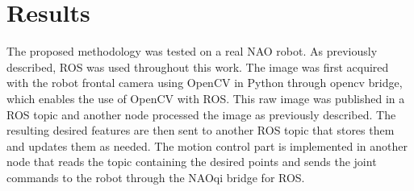 \documentclass[conference]{IEEEtran}
\begin{document}
\section{Results}

The proposed methodology was tested on a real NAO robot. As previously described, ROS was used throughout this work. The image was first acquired with the robot frontal camera using OpenCV in Python through opencv bridge, which enables the use of OpenCV with ROS. This raw image was published in a ROS topic and another node processed the image as previously described. The resulting desired features are then sent to another ROS topic that stores them and updates them as needed. The motion control part is implemented in another node that reads the topic containing the desired points and sends the joint commands to the robot through the NAOqi bridge for ROS.
\end{document}
